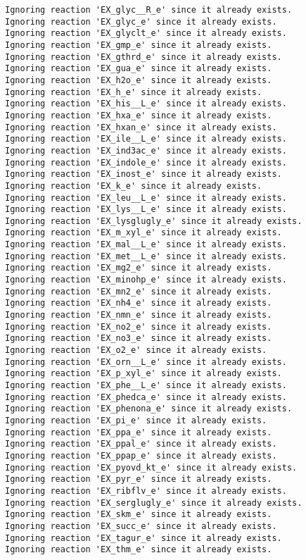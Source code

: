 \documentclass[
  letterpaper,
  DIV=11,
  numbers=noendperiod]{scrartcl}
\begin{document}
\begin{verbatim}
Ignoring reaction 'EX_glyc__R_e' since it already exists.
Ignoring reaction 'EX_glyc_e' since it already exists.
Ignoring reaction 'EX_glyclt_e' since it already exists.
Ignoring reaction 'EX_gmp_e' since it already exists.
Ignoring reaction 'EX_gthrd_e' since it already exists.
Ignoring reaction 'EX_gua_e' since it already exists.
Ignoring reaction 'EX_h2o_e' since it already exists.
Ignoring reaction 'EX_h_e' since it already exists.
Ignoring reaction 'EX_his__L_e' since it already exists.
Ignoring reaction 'EX_hxa_e' since it already exists.
Ignoring reaction 'EX_hxan_e' since it already exists.
Ignoring reaction 'EX_ile__L_e' since it already exists.
Ignoring reaction 'EX_ind3ac_e' since it already exists.
Ignoring reaction 'EX_indole_e' since it already exists.
Ignoring reaction 'EX_inost_e' since it already exists.
Ignoring reaction 'EX_k_e' since it already exists.
Ignoring reaction 'EX_leu__L_e' since it already exists.
Ignoring reaction 'EX_lys__L_e' since it already exists.
Ignoring reaction 'EX_lysglugly_e' since it already exists.
Ignoring reaction 'EX_m_xyl_e' since it already exists.
Ignoring reaction 'EX_mal__L_e' since it already exists.
Ignoring reaction 'EX_met__L_e' since it already exists.
Ignoring reaction 'EX_mg2_e' since it already exists.
Ignoring reaction 'EX_minohp_e' since it already exists.
Ignoring reaction 'EX_mn2_e' since it already exists.
Ignoring reaction 'EX_nh4_e' since it already exists.
Ignoring reaction 'EX_nmn_e' since it already exists.
Ignoring reaction 'EX_no2_e' since it already exists.
Ignoring reaction 'EX_no3_e' since it already exists.
Ignoring reaction 'EX_o2_e' since it already exists.
Ignoring reaction 'EX_orn__L_e' since it already exists.
Ignoring reaction 'EX_p_xyl_e' since it already exists.
Ignoring reaction 'EX_phe__L_e' since it already exists.
Ignoring reaction 'EX_phedca_e' since it already exists.
Ignoring reaction 'EX_phenona_e' since it already exists.
Ignoring reaction 'EX_pi_e' since it already exists.
Ignoring reaction 'EX_ppa_e' since it already exists.
Ignoring reaction 'EX_ppal_e' since it already exists.
Ignoring reaction 'EX_ppap_e' since it already exists.
Ignoring reaction 'EX_pyovd_kt_e' since it already exists.
Ignoring reaction 'EX_pyr_e' since it already exists.
Ignoring reaction 'EX_ribflv_e' since it already exists.
Ignoring reaction 'EX_serglugly_e' since it already exists.
Ignoring reaction 'EX_skm_e' since it already exists.
Ignoring reaction 'EX_succ_e' since it already exists.
Ignoring reaction 'EX_tagur_e' since it already exists.
Ignoring reaction 'EX_thm_e' since it already exists.

\end{verbatim}
\end{document}
